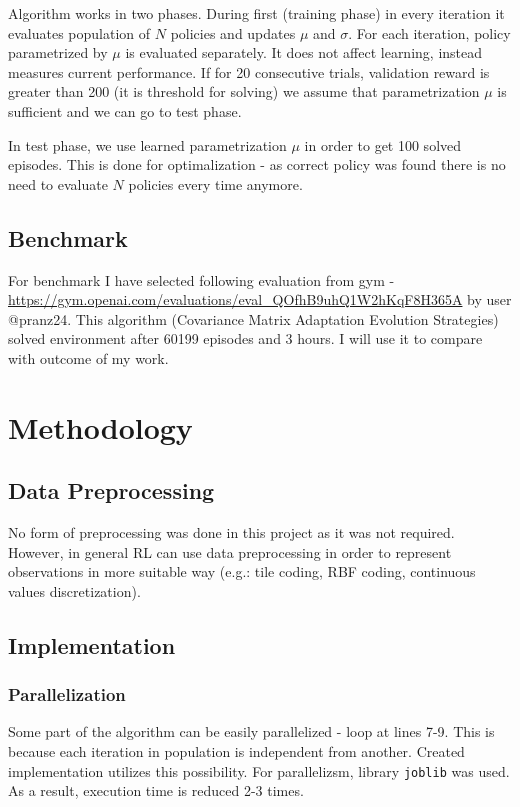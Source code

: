 \documentclass[12pt]{article}
\begin{document}
Algorithm works in two phases. During first (training phase) in every iteration it evaluates population of $N$ policies and updates $\mu$ and $\sigma$. For each iteration, policy parametrized by $\mu$ is evaluated separately. It does not affect learning, instead measures current performance. If for 20 consecutive trials, validation reward is greater than 200 (it is threshold for solving) we assume that parametrization $\mu$ is sufficient and we can go to test phase.

In test phase, we use learned parametrization $\mu$ in order to get 100 solved episodes. This is done for optimalization - as correct policy was found there is no need to evaluate $N$ policies every time anymore.


\subsection{Benchmark}

For benchmark I have selected following evaluation from gym - \url{https://gym.openai.com/evaluations/eval_QOfhB9uhQ1W2hKqF8H365A} by user @pranz24. This algorithm (Covariance Matrix Adaptation Evolution Strategies) solved environment after 60199 episodes and 3 hours. I will use it to compare with outcome of my work.

\section{Methodology}
\subsection{Data Preprocessing}

No form of preprocessing was done in this project as it was not required. However, in general RL can use data preprocessing in order to represent observations in more suitable way (e.g.: tile coding, RBF coding, continuous values discretization).

\subsection{Implementation}

\subsubsection{Parallelization}

Some part of the algorithm can be easily parallelized - loop at lines 7-9. This is because each iteration in population is independent from another. Created implementation utilizes this possibility. For parallelizsm, library \texttt{joblib} was used. As a result, execution time is reduced 2-3 times.
\end{document}
